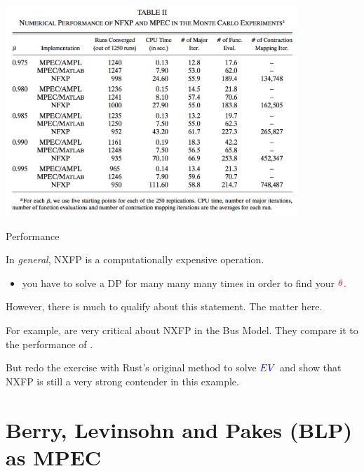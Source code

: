 \documentclass[english]{beamer}
\begin{document}
\begin{frame}{\cite{juddsu}}
\includegraphics[width=11cm]{su-2.png}

\end{frame}

\begin{frame}{Performance}
\begin{midi}
\item In \emph{general}, NXFP is a computationally expensive operation.
\begin{itemize}
\item you have to solve a DP for many many many times in order to find your ${\color{red}{\theta}}$.
\end{itemize}
\item However, there is much to qualify about this statement. The  matter here.
\item For example, \cite{juddsu} are very critical about NXFP in the Bus Model. They compare it to the performance of .
\item But \citet{iskhakov2016comment} redo the exercise with Rust's original method to solve ${\color{blue}{EV}}$ and show that NXFP is still a very strong contender in this example.
\end{midi}
\end{frame}


\section{Berry, Levinsohn and Pakes (BLP) as MPEC}

\begin{frame}
\tableofcontents[currentsection] 
\end{frame}
	
\end{document}
